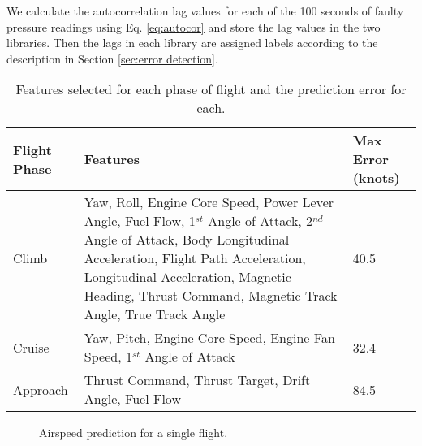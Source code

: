 \documentclass[]{aiaa-tc}
\begin{document}
We calculate the autocorrelation lag values for each of the 100 seconds of faulty pressure readings using Eq. \ref{eq:autocor} and store the lag values in the two libraries. Then the lags in each library are assigned labels according to the description in Section \ref{sec:error detection}. 


\begin{table}[h!]
\caption{\label{table:feat}Features selected for each phase of flight and the prediction error for each.}
\begin{tabular}{ m{4em} m{35em}m{5em}} 
   \hline\hline
 Flight Phase & Features & Max Error (knots)\\ 
\hline
 Climb & Yaw, Roll, Engine Core Speed, Power Lever Angle, Fuel Flow, 1$^{st}$ Angle of Attack, 2$^{nd}$ Angle of Attack, Body Longitudinal Acceleration, Flight Path Acceleration, Longitudinal Acceleration, Magnetic Heading, Thrust Command, Magnetic Track Angle, True Track Angle& 40.5\\

Cruise & Yaw, Pitch, Engine Core Speed, Engine Fan Speed, 1$^{st}$ Angle of Attack & 32.4 \\ 

Approach & Thrust Command, Thrust Target, Drift Angle, Fuel Flow & 84.5  \\
\hline
\hline
\end{tabular}
\end{table}
\begin{figure}

\caption{\label{fig:Airspeed predictions}Airspeed prediction for a single flight.}
\end{figure}
\end{document}
